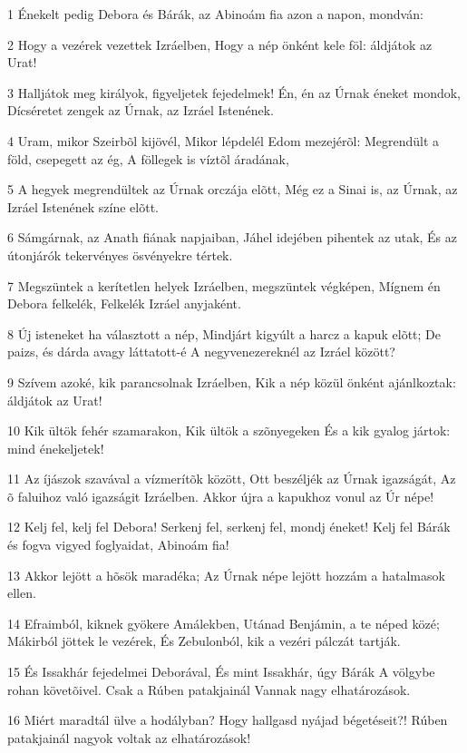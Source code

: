 \par 1 Énekelt pedig Debora és Bárák, az Abinoám fia azon a napon, mondván:
\par 2 Hogy a vezérek vezettek Izráelben, Hogy a nép önként kele föl: áldjátok az Urat!
\par 3 Halljátok meg királyok, figyeljetek fejedelmek! Én, én az Úrnak éneket mondok, Dícséretet zengek az Úrnak, az Izráel Istenének.
\par 4 Uram, mikor Szeirbõl kijövél, Mikor lépdelél Edom mezejérõl: Megrendült a föld, csepegett az ég, A föllegek is víztõl áradának,
\par 5 A hegyek megrendültek az Úrnak orczája elõtt, Még ez a Sinai is, az Úrnak, az Izráel Istenének színe elõtt.
\par 6 Sámgárnak, az Anath fiának napjaiban, Jáhel idejében pihentek az utak, És az útonjárók tekervényes ösvényekre tértek.
\par 7 Megszüntek a kerítetlen helyek Izráelben, megszüntek végképen, Mígnem én Debora felkelék, Felkelék Izráel anyjaként.
\par 8 Új isteneket ha választott a nép, Mindjárt kigyúlt a harcz a kapuk elõtt; De paizs, és dárda avagy láttatott-é A negyvenezereknél az Izráel között?
\par 9 Szívem azoké, kik parancsolnak Izráelben, Kik a nép közül önként ajánlkoztak: áldjátok az Urat!
\par 10 Kik ültök fehér szamarakon, Kik ültök a szõnyegeken És a kik gyalog jártok: mind énekeljetek!
\par 11 Az íjászok szavával a vízmerítõk között, Ott beszéljék az Úrnak igazságát, Az õ faluihoz való igazságit Izráelben. Akkor újra a kapukhoz vonul az Úr népe!
\par 12 Kelj fel, kelj fel Debora! Serkenj fel, serkenj fel, mondj éneket! Kelj fel Bárák és fogva vigyed foglyaidat, Abinoám fia!
\par 13 Akkor lejött a hõsök maradéka; Az Úrnak népe lejött hozzám a hatalmasok ellen.
\par 14 Efraimból, kiknek gyökere Amálekben, Utánad Benjámin, a te néped közé; Mákirból jöttek le vezérek, És Zebulonból, kik a vezéri pálczát tartják.
\par 15 És Issakhár fejedelmei Deborával, És mint Issakhár, úgy Bárák A völgybe rohan követõivel. Csak a Rúben patakjainál Vannak nagy elhatározások.
\par 16 Miért maradtál ülve a hodályban? Hogy hallgasd nyájad bégetéseit?! Rúben patakjainál nagyok voltak az elhatározások!
